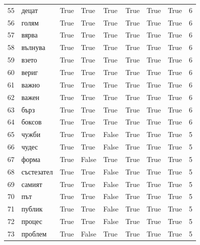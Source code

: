 \begin{longtable}{rlllllllr}
  55 &       децат &     True &   True &   True &       True &           True &      True &      6 \\
  56 &       голям &     True &   True &   True &       True &           True &      True &      6 \\
  57 &       вярва &     True &   True &   True &       True &           True &      True &      6 \\
  58 &     вълнува &     True &   True &   True &       True &           True &      True &      6 \\
  59 &       взето &     True &   True &   True &       True &           True &      True &      6 \\
  60 &       вериг &     True &   True &   True &       True &           True &      True &      6 \\
  61 &       важно &     True &   True &   True &       True &           True &      True &      6 \\
  62 &       важен &     True &   True &   True &       True &           True &      True &      6 \\
  63 &        бърз &     True &   True &   True &       True &           True &      True &      6 \\
  64 &      боксов &     True &   True &   True &       True &           True &      True &      6 \\
  65 &       чужби &     True &   True &  False &       True &           True &      True &      5 \\
  66 &       чудес &     True &   True &  False &       True &           True &      True &      5 \\
  67 &       форма &     True &  False &   True &       True &           True &      True &      5 \\
  68 &  състезател &     True &   True &  False &       True &           True &      True &      5 \\
  69 &      самият &     True &   True &  False &       True &           True &      True &      5 \\
  70 &         път &     True &   True &  False &       True &           True &      True &      5 \\
  71 &      публик &     True &   True &  False &       True &           True &      True &      5 \\
  72 &      процес &     True &   True &  False &       True &           True &      True &      5 \\
  73 &     проблем &     True &  False &   True &       True &           True &      True &      5 \\

\end{longtable}
